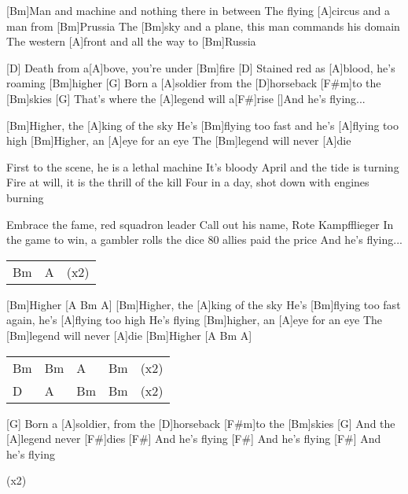 

\begin{guitar}
	[Bm]Man and machine and nothing there in between
	The flying [A]circus and a man from [Bm]Prussia
	The [Bm]sky and a plane, this man commands his domain
	The western [A]front and all the way to [Bm]Russia
	
	[D] Death from a[A]bove, you're under [Bm]fire
	[D] Stained red as [A]blood, he’s roaming [Bm]higher
	[G] Born a [A]soldier from the [D]horseback [F#m]to the [Bm]skies
	[G] That's where the [A]legend will a[F#]rise
	[]And he's flying...
	
	[Bm]Higher, the [A]king of the sky
	He’s [Bm]flying too fast and he's [A]flying too high
	[Bm]Higher, an [A]eye for an eye
	The [Bm]legend will never [A]die
	
	First to the scene, he is a lethal machine
	It's bloody April and the tide is turning
	Fire at will, it is the thrill of the kill
	Four in a day, shot down with engines burning
	
	Embrace the fame, red squadron leader
	Call out his name, Rote Kampfflieger
	In the game to win, a gambler rolls the dice
	80 allies paid the price
	And he's flying...
	
	 
	\pagebreak
	{\footnotesize\begin{tabular}{l|ll}
			Bm & A & (x2)
	\end{tabular}}
	
	[Bm]Higher [A  Bm A]{}
	[Bm]Higher, the [A]king of the sky
	He's [Bm]flying too fast again, he's [A]flying too high
	He’s flying [Bm]higher, an [A]eye for an eye
	The [Bm]legend will never [A]die
	[Bm]Higher [A  Bm A]
	
	{\footnotesize\begin{tabular}{l|l|l|ll}
			Bm & Bm & A & Bm & (x2)\\
			D & A & Bm & Bm & (x2)
	\end{tabular}}
	
	[G] Born a [A]soldier, from the [D]horseback [F#m]to the [Bm]skies
	[G] And the [A]legend never [F#]dies
	[F#] And he’s flying
	[F#] And he’s flying
	[F#] And he’s flying
	
	  (x2)
\end{guitar}